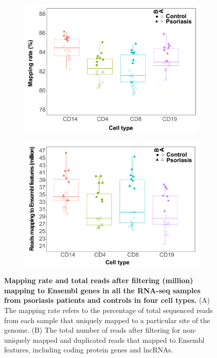 \begin{figure}[htbp]
\centering
\begin{subfigure}{0.5\textwidth}
\centering
\includegraphics[width=\textwidth]{./Appendix/pdfs/Chapter4/PS_CTL_RNAseq_uniquely_mapped_reads_rate_cell_type_batch_and_condition_boxplots}
\caption{\textbf{}}
\end{subfigure}%
\begin{subfigure}{0.5\textwidth}
\centering
\includegraphics[width=\textwidth]{./Appendix/pdfs/Chapter4/PS_CTL_RNAseq_total_reads_per_batch_cell_type_and_condition}
\caption{\textbf{}}
\end{subfigure}
\caption[Mapping rate and total reads after filtering (million) mapping to Ensembl genes in all the RNA-seq samples from psoriasis patients and controls in four cell types.]{\textbf{Mapping rate and total reads after filtering (million) mapping to Ensembl genes in all the RNA-seq samples from psoriasis patients and controls in four cell types.} (A) The mapping rate refers to the percentage of total sequenced reads from each sample that uniquely mapped to a particular site of the genome. (B) The total number of reads after filtering for non-uniquely mapped and duplicated reads that mapped to Ensembl features, including coding protein genes and lncRNAs.}
\label{figure:RNAseq_mapping_rate_and_reads_in_genes}
\end{figure} 


